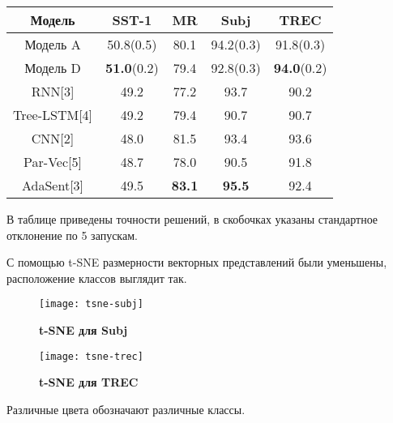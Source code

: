  \label{tab:title} 
\begin{tabular}{|c|c|c|c|c|}
\hline
Модель    & SST-1               & MR           & Subj         & TREC  \\ \hline
Модель A  & 50.8(0.5)           & 80.1         & 94.2(0.3)    & 91.8(0.3) \\
Модель D  & \textbf{51.0}(0.2)  & 79.4         & 92.8(0.3)    & \textbf{94.0}(0.2)\\ \hline
RNN[3]    & 49.2                & 77.2         & 93.7         & 90.2  \\
Tree-LSTM[4]& 49.2              & 79.4         & 90.7         & 90.7  \\
CNN[2]    & 48.0                & 81.5         & 93.4         & 93.6  \\
Par-Vec[5]& 48.7                & 78.0         & 90.5         & 91.8  \\
AdaSent[3]& 49.5                & \textbf{83.1}& \textbf{95.5}& 92.4 \\ \hline
\end{tabular}

\vspace{5mm}

В таблице приведены точности решений, в скобочках указаны стандартное отклонение по 5 запускам.

С помощью t-SNE размерности векторных представлений были уменьшены, расположение классов выглядит так.

\begin{figure}[H]
\texttt{[image: tsne-subj]}
\caption{\textbf{t-SNE для Subj}}
\label{fig:context_ex}
\end{figure}
\vspace{5mm}

\begin{figure}[H]
\texttt{[image: tsne-trec]}
\caption{\textbf{t-SNE для TREC}}
\label{fig:context_ex}
\end{figure}
\vspace{5mm}

Различные цвета обозначают различные классы.
